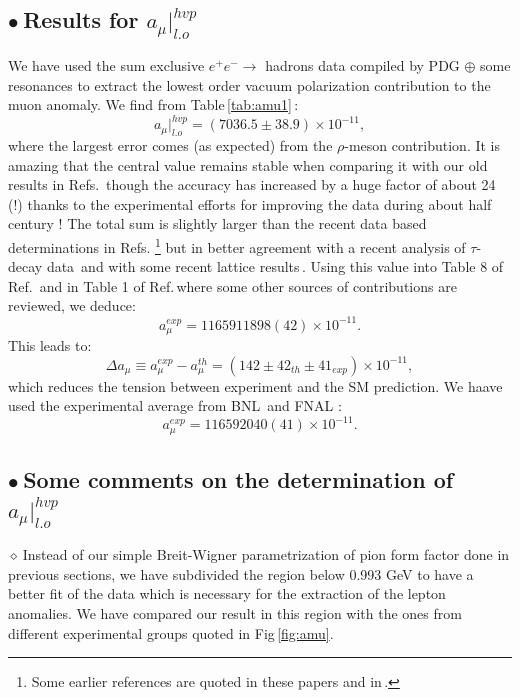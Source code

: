 \documentclass[review]{elsarticle}
\def\beq{\begin{equation}}
\def\eeq{\end{equation}}
\def\b{$\bullet~$}
\def\d{$\diamond~$}
\begin{document}
\subsection*{\b Results for $a_\mu\vert^{hvp}_{l.o}$} 
We have used  the sum  exclusive $e^+e^-\to$ hadrons data compiled by PDG $\oplus$ some resonances to extract the 
lowest order vacuum polarization contribution to the muon anomaly. We find from Table\,\ref{tab:amu1}\,:
\beq
a_\mu\vert^{hvp}_{l.o}=(7036.5\pm 38.9)\times 10^{-11},
\eeq
where the largest error comes (as expected) from the $\rho$-meson contribution. It is amazing that the central value remains stable when comparing it with our old results in Refs.\,\cite{CALMET,SN76,SN78,SNamu} though the accuracy has increased by a huge factor of about 24 (!) thanks to the experimental efforts for improving the data during about half century !  The total sum is slightly larger  than the recent data based determinations in Refs.\,\cite{NOMURA,DAVIER2}\,\footnote{Some earlier references are quoted in these papers and in\,\cite{SNamu}.} but in better agreement with a recent analysis of $\tau$-decay data\,\cite{MIRANDA}  and with some recent lattice results\,\cite{RAF,GM2,LATTICE}.  Using this value into Table 8 of Ref.\,\cite{KNECHT} and in Table 1 of Ref.\,\cite{GM2}where some other sources of contributions are reviewed, we deduce:
\beq
a_\mu^{exp}= 1165911898(42)\times 10^{-11}.
\eeq
This leads to:
\beq
\Delta a_\mu\equiv a_\mu^{exp}-a_\mu^{th} = (142\pm 42_{th}\pm 41_{exp})\times 10^{-11},
\label{eq:amu-sm}
\eeq
which reduces the tension between experiment and the SM prediction. We haave used the experimental average from BNL\,\cite{BNL} and FNAL\,\cite{FNAL}\,:
\beq
a_\mu^{exp}= 116592040(41)\times 10^{-11}.
\eeq
\subsection*{\b Some comments on the determination of  $a_\mu\vert^{hvp}_{l.o}$} 
\d  Instead of our simple Breit-Wigner parametrization of pion form factor done in previous sections, we have subdivided the region below 0.993 GeV to have a better fit of the data which is necessary for the extraction of the lepton anomalies. 
We have compared our result in this region with  the ones from different experimental groups quoted in Fig\,\ref{fig:amu}.
\end{document}

